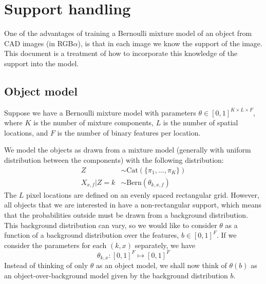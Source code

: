 \documentclass{article}
\newcommand{\Bern}[1]{\text{Bern}(#1)}
\begin{document}


\section{Support handling}
One of the advantages of training a Bernoulli mixture model of an object from CAD images (in RGB$\alpha$), is that in each image we know the support of the image. This document is a treatment of how to incorporate this knowledge of the support into the model.
%
%
%


\subsection{Object model}
Suppose we have a Bernoulli mixture model with parameters $\theta \in [0, 1]^{K \times L \times F}$, where $K$ is the number of mixture components, $L$ is the number of spatial locations, and $F$ is the number of binary features per location.%

We model the objects as drawn from a mixture model (generally with uniform distribution between the components) with the following distribution:
\begin{align*}
    Z &\sim \text{Cat}(\{\pi_1, \dots, \pi_K\}) \\
    X_{x,f} | Z = k &\sim \Bern{\theta_{k,x,f}}
\end{align*}
%
The $L$ pixel locations are defined on an evenly spaced rectangular grid. However, all objects that we are interested in have a non-rectangular support, which means that the probabilities outside must be drawn from a background distribution. This background distribution can vary, so we would like to consider $\theta$ as a function of a background distribution over the features, $b \in [0, 1]^F$. If we consider the parameters for each $(k,x)$ separately, we have 
\[  
    \theta_{k,x} : [0, 1]^F \mapsto [0, 1]^F
\]
%
Instead of thinking of only $\theta$ as an object model, we shall now think of $\theta(b)$ as an object-over-background model given by the background distribution $b$.
\end{document}
